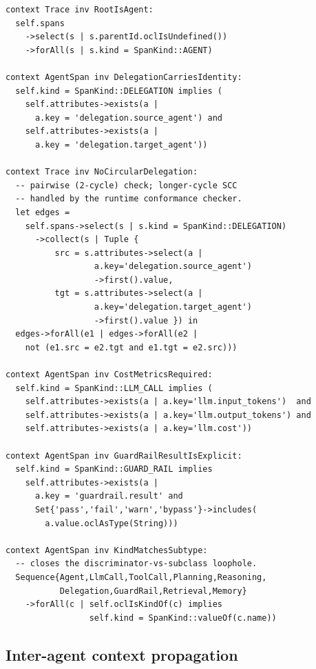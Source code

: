 \documentclass[sigconf,nonacm]{acmart}
\begin{document}
\begin{lstlisting}[language=OCL,caption={OCL well-formedness constraints on the DSM (released as \texttt{agenttelemetry.ocl}).},label={lst:ocl}]
context Trace inv RootIsAgent:
  self.spans
    ->select(s | s.parentId.oclIsUndefined())
    ->forAll(s | s.kind = SpanKind::AGENT)

context AgentSpan inv DelegationCarriesIdentity:
  self.kind = SpanKind::DELEGATION implies (
    self.attributes->exists(a |
      a.key = 'delegation.source_agent') and
    self.attributes->exists(a |
      a.key = 'delegation.target_agent'))

context Trace inv NoCircularDelegation:
  -- pairwise (2-cycle) check; longer-cycle SCC
  -- handled by the runtime conformance checker.
  let edges =
    self.spans->select(s | s.kind = SpanKind::DELEGATION)
      ->collect(s | Tuple {
          src = s.attributes->select(a |
                  a.key='delegation.source_agent')
                  ->first().value,
          tgt = s.attributes->select(a |
                  a.key='delegation.target_agent')
                  ->first().value }) in
  edges->forAll(e1 | edges->forAll(e2 |
    not (e1.src = e2.tgt and e1.tgt = e2.src)))

context AgentSpan inv CostMetricsRequired:
  self.kind = SpanKind::LLM_CALL implies (
    self.attributes->exists(a | a.key='llm.input_tokens')  and
    self.attributes->exists(a | a.key='llm.output_tokens') and
    self.attributes->exists(a | a.key='llm.cost'))

context AgentSpan inv GuardRailResultIsExplicit:
  self.kind = SpanKind::GUARD_RAIL implies
    self.attributes->exists(a |
      a.key = 'guardrail.result' and
      Set{'pass','fail','warn','bypass'}->includes(
        a.value.oclAsType(String)))

context AgentSpan inv KindMatchesSubtype:
  -- closes the discriminator-vs-subclass loophole.
  Sequence{Agent,LlmCall,ToolCall,Planning,Reasoning,
           Delegation,GuardRail,Retrieval,Memory}
    ->forAll(c | self.oclIsKindOf(c) implies
                 self.kind = SpanKind::valueOf(c.name))
\end{lstlisting}

\subsection{Inter-agent context propagation}
\end{document}
